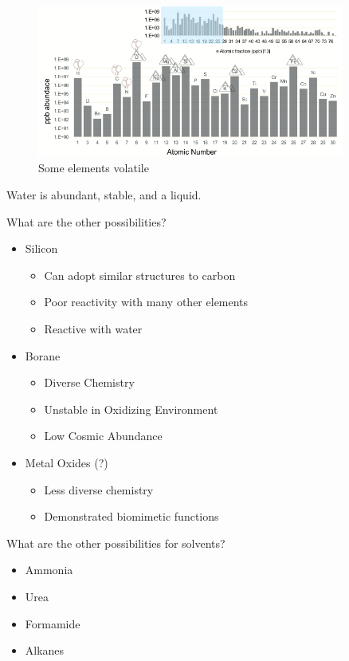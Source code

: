 \documentclass[]{article}
\begin{document}
\begin{figure}[H]
	\caption{Some elements volatile}\label{fig:volatiles} 
	\includegraphics[width=0.9\textwidth]{AbundancesGases}
\end{figure}

Water is abundant, stable, and a liquid.

What are the other possibilities?
\begin{itemize}
	\item Silicon
	\begin{itemize}
		\item Can adopt similar structures to carbon
		\item Poor reactivity with many other elements
		\item Reactive with water
	\end{itemize}
	\item Borane
	\begin{itemize}
		\item Diverse Chemistry
		\item Unstable in Oxidizing Environment
		\item Low Cosmic Abundance
	\end{itemize}
	\item Metal Oxides (?)
\begin{itemize}
	\item 	Less diverse chemistry
	\item Demonstrated biomimetic functions
\end{itemize}
\end{itemize}

What are the other possibilities for solvents?
\begin{itemize}
	\item Ammonia
	\item Urea
	\item Formamide
	\item Alkanes
\end{itemize}
\end{document}
